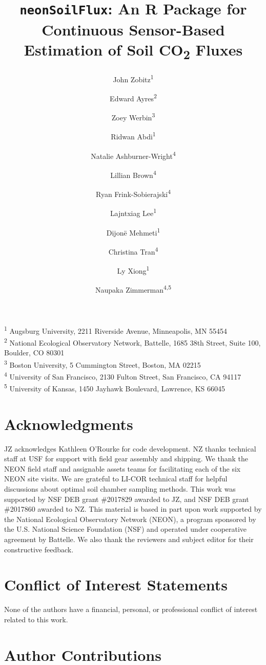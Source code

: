 \documentclass[
  letterpaper,
  DIV=11,
  numbers=noendperiod]{scrartcl}
\title{\texttt{neonSoilFlux}: An R Package for Continuous Sensor-Based
Estimation of Soil CO\textsubscript{2} Fluxes}
\author{John Zobitz\textsuperscript{1} \and Edward
Ayres\textsuperscript{2} \and Zoey Werbin\textsuperscript{3} \and Ridwan
Abdi\textsuperscript{1} \and Natalie
Ashburner-Wright\textsuperscript{4} \and Lillian
Brown\textsuperscript{4} \and Ryan
Frink-Sobierajski\textsuperscript{4} \and Lajntxiag
Lee\textsuperscript{1} \and Dijonë
Mehmeti\textsuperscript{1} \and Christina
Tran\textsuperscript{4} \and Ly Xiong\textsuperscript{1} \and Naupaka
Zimmerman\textsuperscript{4,5}}
\date{}
\begin{document}
\maketitle

\textsuperscript{1} Augsburg University, 2211 Riverside Avenue,
Minneapolis, MN 55454\\
\textsuperscript{2} National Ecological Observatory Network, Battelle,
1685 38th Street, Suite 100, Boulder, CO 80301\\
\textsuperscript{3} Boston University, 5 Cummington Street, Boston, MA
02215\\
\textsuperscript{4} University of San Francisco, 2130 Fulton Street, San
Francisco, CA 94117\\
\textsuperscript{5} University of Kansas, 1450 Jayhawk Boulevard,
Lawrence, KS 66045

\section*{Acknowledgments}\label{acknowledgments}

JZ acknowledges Kathleen O'Rourke for code development. NZ thanks
technical staff at USF for support with field gear assembly and
shipping. We thank the NEON field staff and assignable assets teams for
facilitating each of the six NEON site visits. We are grateful to LI-COR
technical staff for helpful discussions about optimal soil chamber
sampling methods. This work was supported by NSF DEB grant \#2017829
awarded to JZ, and NSF DEB grant \#2017860 awarded to NZ. This material
is based in part upon work supported by the National Ecological
Observatory Network (NEON), a program sponsored by the U.S. National
Science Foundation (NSF) and operated under cooperative agreement by
Battelle. We also thank the reviewers and subject editor for their
constructive feedback.

\section*{Conflict of Interest
Statements}\label{conflict-of-interest-statements}

None of the authors have a financial, personal, or professional conflict
of interest related to this work.

\section*{Author Contributions}\label{author-contributions}
\end{document}

